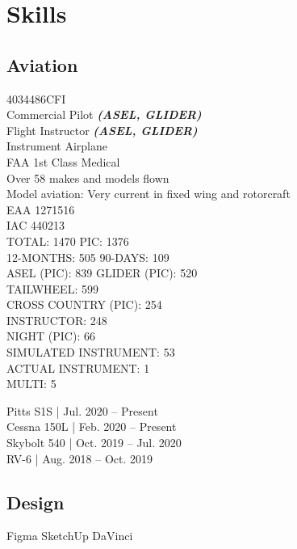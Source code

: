 \documentclass[]{mershon-two-column-resume}
\begin{document}
\begin{minipage}[t]{0.33\textwidth}
		\section{Skills}
		
		\subsection{Aviation}
		4034486CFI \\
		Commercial Pilot {\footnotesize \textit{\textbf{(ASEL, GLIDER)}}} \\
		Flight Instructor {\footnotesize \textit{\textbf{(ASEL, GLIDER)}}} \\
		Instrument Airplane \\
		FAA 1st Class Medical \\
		Over 58 makes and models flown \\
		Model aviation: Very current in fixed wing and rotorcraft \\
		
		EAA 1271516 \\
		IAC 440213 \\
		
		\sectionsep
		TOTAL: 1470 \textbullet{} PIC: 1376 \\
		12-MONTHS: 505 \textbullet{} 90-DAYS: 109 \\
		ASEL (PIC): 839 \textbullet{} GLIDER (PIC): 520 \\
		TAILWHEEL: 599 \\
		CROSS COUNTRY (PIC): 254 \\
		INSTRUCTOR: 248 \\
		NIGHT (PIC): 66 \\
		SIMULATED INSTRUMENT: 53 \\
		ACTUAL INSTRUMENT: 1 \\
		MULTI: 5 \\
				
		\sectionsep
		
		Pitts S1S | Jul. 2020 – Present \\
		Cessna 150L | Feb. 2020 – Present \\
		Skybolt 540 | Oct. 2019 – Jul. 2020 \\
		RV-6 | Aug. 2018 – Oct. 2019 \\
		
		\sectionsep
		
		\subsection{Design}
		Figma \textbullet{} SketchUp \textbullet{} DaVinci \\
		

\end{minipage}
\end{document}

